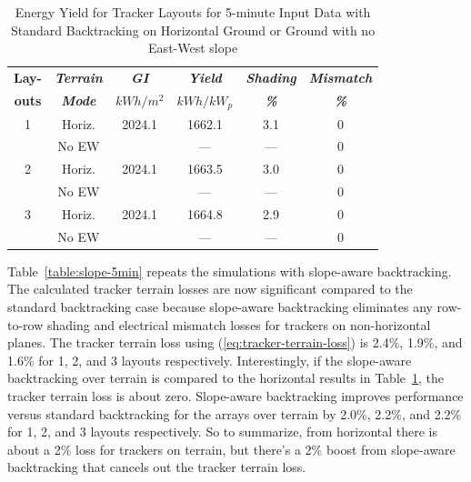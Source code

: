 \documentclass[conference]{IEEEtran}
\begin{document}
\begin{table}[htbp]
\caption{Energy Yield for Tracker Layouts for 5-minute Input Data with Standard Backtracking on Horizontal Ground or Ground with no East-West slope}
\begin{center}
\begin{tabular}{|c|c|c|c|c|c|}
\hline
\textbf{Lay-}& \textbf{\textit{Terrain}}& \textbf{\textit{GI}}&        \textbf{\textit{Yield}}&        \textbf{\textit{Shading}}& \textbf{\textit{Mismatch}} \\
\textbf{outs}& \textbf{\textit{Mode}}&    \textbf{\textit{$kWh/m^2$}}& \textbf{\textit{$kWh / kW_p$}}& \textbf{\textit{\%}}&      \textbf{\textit{\%}} \\
\hline
1& Horiz.& 2024.1&  1662.1& 3.1& 0 \\
 & No EW &       &     ---& ---& 0 \\
\hline
2& Horiz.& 2024.1&  1663.5& 3.0& 0 \\
 & No EW &       &     ---& ---& 0 \\
\hline
3& Horiz.& 2024.1&  1664.8& 2.9& 0 \\
 & No EW &       &     ---& ---& 0 \\
\hline
\end{tabular}
\label{table:horizontal-5min}
\end{center}
\end{table}

Table~\ref{table:slope-5min} repeats the simulations with slope-aware backtracking. The calculated tracker terrain losses are now significant compared to the standard backtracking case because slope-aware backtracking eliminates any row-to-row shading and electrical mismatch losses for trackers on non-horizontal planes. The tracker terrain loss using (\ref{eq:tracker-terrain-loss}) is 2.4\%, 1.9\%, and 1.6\% for 1, 2, and 3 layouts respectively. Interestingly, if the slope-aware backtracking over terrain is compared to the horizontal results in Table~\ref{table:horizontal-5min}, the tracker terrain loss is about zero. Slope-aware backtracking improves performance versus standard backtracking for the arrays over terrain by 2.0\%, 2.2\%, and 2.2\% for 1, 2, and 3 layouts respectively. So to summarize, from horizontal there is about a 2\% loss for trackers on terrain, but there's a 2\% boost from slope-aware backtracking that cancels out the tracker terrain loss.
\end{document}
